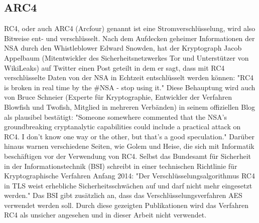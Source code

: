 \documentclass[10pt, a4paper]{scrreprt}
\begin{document}
\subsection{ARC4}
RC4, oder auch ARC4 (Arcfour) genannt ist eine Stromverschlüsselung, wird also Bitweise ent- und verschlüsselt. %
Nach dem Aufdecken geheimer Informationen der NSA durch den Whistleblower Edward Snowden, hat der Kryptograph Jacob Appelbaum (Mitentwickler des Sicherheitsnetzwerkes Tor und Unterstützer von WikiLeaks) auf Twitter einen Post geteilt in dem er sagt, dass mit RC4 verschlüsselte Daten von der NSA in Echtzeit entschlüsselt werden können: "RC4 is broken in real time by the \#NSA - stop using it." %
Diese Behauptung wird auch von Bruce Schneier (Experte für Kryptographie, Entwickler der Verfahren Blowfish und Twofish, Mitglied in mehreren Verbänden) in seinem offiziellen Blog als plausibel bestätigt: "Someone somewhere commented that the NSA's groundbreaking cryptanalytic capabilities could include a practical attack on RC4. I don't know one way or the other, but that's a good speculation." %
Darüber hinaus warnen verschiedene Seiten, wie Golem und Heise, die sich mit Informatik beschäftigen vor der Verwendung von RC4. %
Selbst das Bundesamt für Sicherheit in der Informationstechnik (BSI) schreibt in einer technischen Richtlinie für Kryptographische Verfahren Anfang 2014: "Der Verschlüsselungsalgorithmus RC4 in TLS weist erhebliche Sicherheitsschwächen auf und darf nicht mehr eingesetzt werden." Das BSI gibt zusätzlich an, dass das Verschlüsselungsverfahren AES verwendet werden soll. %
Durch diese gezeigten Publikationen wird das Verfahren RC4 als unsicher angesehen und in dieser Arbeit nicht verwendet.
\end{document}

